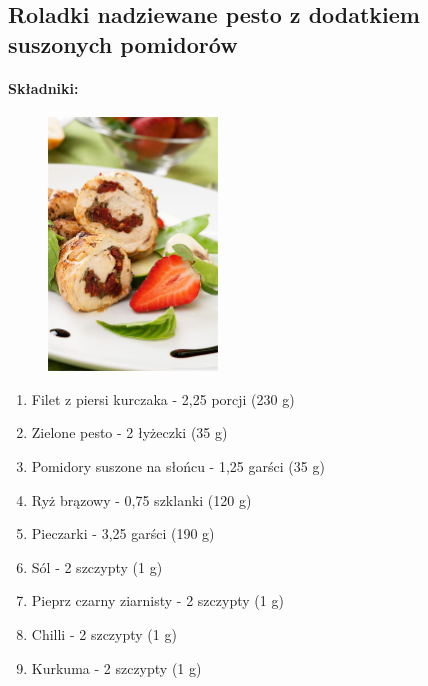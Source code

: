 \documentclass{article}
\begin{document}
    \subsection{Roladki nadziewane pesto z dodatkiem suszonych pomidorów}
    \bigskip
    \paragraph{Składniki:}
    \begin{figure}
        \includegraphics[width=0.4\textwidth]{roladki-z-suszonymi-pomidorami-i-pesto.jpg}
    \end{figure}
    \begin{enumerate}
        \item Filet z piersi kurczaka - 2,25 porcji (230 g)
        \item Zielone pesto - 2 łyżeczki (35 g)
        \item Pomidory suszone na słońcu - 1,25 garści (35 g)
        \item Ryż brązowy - 0,75 szklanki (120 g)
        \item Pieczarki - 3,25 garści (190 g)
        \item Sól - 2 szczypty (1 g)
        \item Pieprz czarny ziarnisty - 2 szczypty (1 g)
        \item Chilli - 2 szczypty (1 g)
        \item Kurkuma - 2 szczypty (1 g)
    \end{enumerate}
\end{document}
